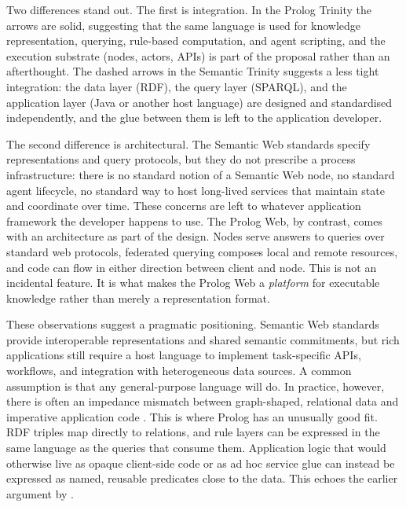 \noindent Two differences stand out. The first is integration. In the Prolog Trinity the arrows are solid, suggesting that the same language is used for knowledge representation, querying, rule-based computation, and agent scripting, and the execution substrate (nodes, actors, APIs) is part of the proposal rather than an afterthought. The dashed arrows in the Semantic Trinity suggests a less tight integration: the data layer (RDF), the query layer (SPARQL), and the application layer (Java or another host language) are designed and standardised independently, and the glue between them is left to the application developer. %

The second difference is architectural. The Semantic Web standards specify representations and query protocols, but they do not prescribe a process infrastructure: there is no standard notion of a Semantic Web node, no standard agent lifecycle, no standard way to host long-lived services that maintain state and coordinate over time. These concerns are left to whatever application framework the developer happens to use. The Prolog Web, by contrast, comes with an architecture as part of the design. Nodes serve answers to queries over standard web protocols, federated querying composes local and remote resources, and code can flow in either direction between client and node. This is not an incidental feature. It is what makes the Prolog Web a \emph{platform} for executable knowledge rather than merely a representation format.

These observations suggest a pragmatic positioning. Semantic Web standards provide interoperable representations and shared semantic commitments, but rich applications still require a host language to implement task-specific APIs, workflows, and integration with heterogeneous data sources. A common assumption is that any general-purpose language will do. In practice, however, there is often an impedance mismatch between graph-shaped, relational data and imperative application code \citep{wielemaker2016cliopatria}. This is where Prolog has an unusually good fit. RDF triples map directly to relations, and rule layers can be expressed in the same language as the queries that consume them. Application logic that would otherwise live as opaque client-side code or as ad hoc service glue can instead be expressed as named, reusable predicates close to the data. This echoes the earlier argument by \citet{wielemaker2016cliopatria}.

